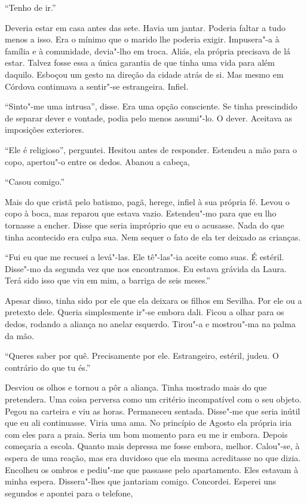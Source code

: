 ``Tenho de ir.''

Deveria estar em casa antes das sete. Havia um jantar. Poderia faltar a
tudo menos a isso. Era o mínimo que o marido lhe poderia exigir.
Impusera"-a à família e à comunidade, devia"-lho em troca. Aliás, ela
própria precisava de lá estar. Talvez fosse essa a única garantia de que
tinha uma vida para além daquilo. Esboçou um gesto na direção da cidade
atrás de si. Mas mesmo em Córdova continuava a sentir"-se estrangeira.
Infiel.

``Sinto"-me uma intrusa'',
disse. Era uma opção consciente. Se tinha prescindido de separar dever e
vontade, podia pelo menos assumi"-lo. O dever. Aceitava as imposições
exteriores.

``Ele é religioso'',
perguntei. Hesitou antes de responder. Estendeu a mão para o copo,
apertou"-o entre os dedos. Abanou a cabeça,

``Casou comigo.''

Mais do que cristã pelo batismo, pagã, herege, infiel à sua própria fé.
Levou o copo à boca, mas reparou que estava vazio. Estendeu"-mo para que
eu lho tornasse a encher. Disse que seria impróprio que eu o acusasse.
Nada do que tinha acontecido era culpa sua. Nem sequer o fato de ela
ter deixado as crianças.

``Fui eu que me recusei a levá"-las. Ele tê"-las"-ia aceite como suas. É
estéril. Disse"-mo da segunda vez que nos encontramos. Eu estava grávida
da Laura. Terá sido isso que viu em mim, a barriga de seis meses.''

Apesar disso, tinha sido por ele que ela deixara os filhos em Sevilha.
Por ele ou a pretexto dele. Queria simplesmente ir"-se embora dali.
Ficou a olhar para os dedos, rodando a aliança no anelar esquerdo.
Tirou"-a e mostrou"-ma na palma da mão.

``Queres saber por quê. Precisamente por ele. Estrangeiro, estéril, judeu.
O contrário do que tu és.''

Desviou os olhos e tornou a pôr a aliança. Tinha mostrado mais do que
pretendera. Uma coisa perversa como um critério incompatível com o seu
objeto. Pegou na carteira e viu as horas. Permaneceu sentada. Disse"-me
que seria inútil que eu ali continuasse. Viria uma ama. No princípio de
Agosto ela própria iria com eles para a praia. Seria um bom momento para
eu me ir embora. Depois começaria a escola. Quanto mais depressa me
fosse embora, melhor. Calou"-se, à espera de uma reação, mas era
duvidoso que ela mesma acreditasse no que dizia. Encolheu os ombros e
pediu"-me que passasse pelo apartamento. Eles estavam à minha espera.
Dissera"-lhes que jantariam comigo. Concordei. Esperei uns segundos e
apontei para o telefone,

